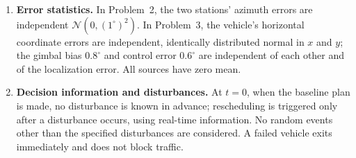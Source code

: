 \begin{enumerate}[label=(A\arabic*)]
\item \textbf{Error statistics.} In Problem~2, the two stations' azimuth errors are independent $\mathcal{N}(0,(1^\circ)^2)$. In Problem~3, the vehicle's horizontal coordinate errors are independent, identically distributed normal in $x$ and $y$; the gimbal bias $0.8^\circ$ and control error $0.6^\circ$ are independent of each other and of the localization error. All sources have zero mean.

\item \textbf{Decision information and disturbances.} At $t=0$, when the baseline plan is made, no disturbance is known in advance; rescheduling is triggered only after a disturbance occurs, using real-time information. No random events other than the specified disturbances are considered. A failed vehicle exits immediately and does not block traffic.
\end{enumerate}
